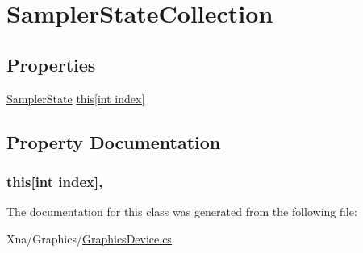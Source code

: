 \hypertarget{classMicrosoft_1_1Xna_1_1Framework_1_1Graphics_1_1SamplerStateCollection}{}\section{Sampler\+State\+Collection}
\label{classMicrosoft_1_1Xna_1_1Framework_1_1Graphics_1_1SamplerStateCollection}
\subsection*{Properties}
\begin{DoxyCompactItemize}
\item 
\hyperlink{classMicrosoft_1_1Xna_1_1Framework_1_1Graphics_1_1SamplerState}{Sampler\+State} \hyperlink{classMicrosoft_1_1Xna_1_1Framework_1_1Graphics_1_1SamplerStateCollection_a12dd31ca8aa7ca2835e5db723caa3033}{this\mbox{[}int index\mbox{]}}
\end{DoxyCompactItemize}


\subsection{Property Documentation}
\hypertarget{classMicrosoft_1_1Xna_1_1Framework_1_1Graphics_1_1SamplerStateCollection_a12dd31ca8aa7ca2835e5db723caa3033}{}
\subsubsection[{this[int index]}]{ this\mbox{[}int index\mbox{]}\hspace{0.3cm}{\ttfamily [get]}, {\ttfamily [set]}}\label{classMicrosoft_1_1Xna_1_1Framework_1_1Graphics_1_1SamplerStateCollection_a12dd31ca8aa7ca2835e5db723caa3033}


The documentation for this class was generated from the following file\+:\begin{DoxyCompactItemize}
\item 
Xna/\+Graphics/\hyperlink{GraphicsDevice_8cs}{Graphics\+Device.\+cs}\end{DoxyCompactItemize}
